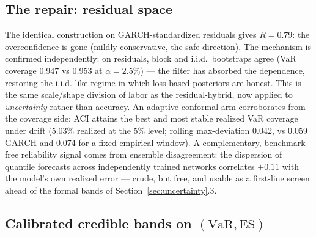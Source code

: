 \documentclass[11pt]{article}
\newcommand{\VaR}{\mathrm{VaR}}
\newcommand{\ES}{\mathrm{ES}}
\theoremstyle{remark}
\begin{document}
\subsection{The repair: residual space}

The identical construction on GARCH-standardized residuals gives $R =
0.79$: the overconfidence is gone (mildly conservative, the safe
direction). The mechanism is confirmed independently: on residuals,
block and i.i.d.\ bootstraps agree (VaR coverage 0.947 vs 0.953 at
$\alpha=2.5\%$) --- the filter has absorbed the dependence, restoring
the i.i.d.-like regime in which loss-based posteriors are honest. This
is the same scale/shape division of labor as the residual-hybrid, now
applied to \emph{uncertainty} rather than accuracy. An adaptive conformal
arm \citep{gibbs2021aci} corroborates from the coverage side: ACI attains
the best and most stable realized VaR coverage under drift (5.03\%
realized at the 5\% level; rolling max-deviation 0.042, vs 0.059 GARCH
and 0.074 for a fixed empirical window). A complementary, benchmark-free
reliability signal comes from ensemble disagreement: the dispersion of
quantile forecasts across independently trained networks correlates
$+0.11$ with the model's own realized error --- crude, but free, and
usable as a first-line screen ahead of the formal bands of
Section~\ref{sec:uncertainty}.3.

\subsection{Calibrated credible bands on $(\VaR, \ES)$}
\end{document}
